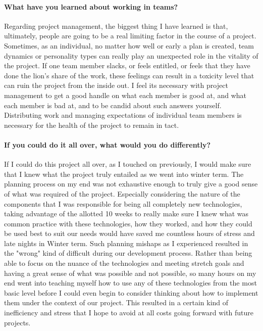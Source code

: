 \documentclass{article}
\begin{document}
\paragraph{What have you learned about working in teams?}
Regarding project management, the biggest thing I have learned is that, ultimately, people are going to be a real limiting factor in the course of a project. Sometimes, as an individual, no matter how well or early a plan is created, team dynamics or personality types can really play an unexpected role in the vitality of the project. If one team member slacks, or feels entitled, or feels that they have done the lion's share of the work, these feelings can result in a toxicity level that can ruin the project from the inside out. I feel its necessary with project management to get a good handle on what each member is good at, and what each member is bad at, and to be candid about such answers yourself. Distributing work and managing expectations of individual team members is necessary for the health of the project to remain in tact.
\paragraph{If you could do it all over, what would you do differently?}
If I could do this project all over, as I touched on previously, I would make sure that I knew what the project truly entailed as we went into winter term. The planning process on my end was not exhaustive enough to truly give a good sense of what was required of the project. Especially considering the nature of the components that I was responsible for being all completely new technologies, taking advantage of the allotted 10 weeks to really make sure I knew what was common practice with these technologies, how they worked, and how they could be used best to suit our needs would have saved me countless hours of stress and late nights in Winter term. Such planning mishaps as I experienced resulted in the "wrong" kind of difficult during our development process. Rather than being able to focus on the nuance of the technologies and meeting stretch goals and having a great sense of what was possible and not possible, so many hours on my end went into teaching myself how to use any of these technologies from the most basic level before I could even begin to consider thinking about how to implement them under the context of our project. This resulted in a certain kind of inefficiency and stress that I hope to avoid at all costs going forward with future projects.
\end{document}

